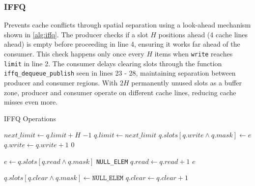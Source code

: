 \subsubsection{\acl{IFFQ}}
Prevents cache conflicts through spatial separation using a look-ahead mechanism shown in \cref{alg:iffq}. The producer checks if a slot $H$ positions ahead (4 cache lines ahead) is empty before proceeding in line 4, ensuring it works far ahead of the consumer. This check happens only once every $H$ items when \texttt{write} reaches \texttt{limit} in line 2. The consumer delays clearing slots through the function \texttt{iffq\_dequeue\_publish} seen in lines 23 - 28, maintaining separation between producer and consumer regions. With $2H$ permanently unused slots as a buffer zone, producer and consumer operate on different cache lines, reducing cache misses even more. \cite{MaffioneCacheAware}

\begin{algorithm}[!ht]
   \centering
   \captionsetup{justification=centering}
   \caption{\acl{IFFQ} Operations \cite{MaffioneCacheAware}}
   \label{alg:iffq}
   \scriptsize
   \begin{algorithmic}[1]
            
               \State $next\_limit \gets q.limit + H$
                   \State \Return $-1$ 
               \EndIf
               \State $q.limit \gets next\_limit$ 
           \EndIf
           \State $q.slots[q.write \land q.mask] \gets e$
           \State $q.write \gets q.write + 1$
           \State \Return $0$
       \EndFunction
       
       \State
       
           \State $e \gets q.slots[q.read \land q.mask]$
               \State \Return \texttt{NULL\_ELEM}
           \EndIf
           \State $q.read \gets q.read + 1$
           \State \Return $e$
       \EndFunction
       
       \State
       
               \State $q.slots[q.clear \land q.mask] \gets \texttt{NULL\_ELEM}$
               \State $q.clear \gets q.clear + 1$
           \EndWhile
       \EndFunction
   \end{algorithmic}
\end{algorithm}

